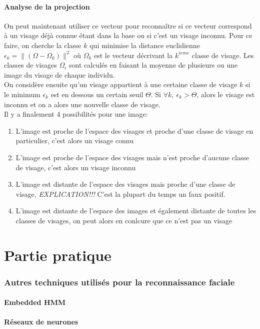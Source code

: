 \documentclass[12pt,french]{article}
\theoremstyle{plain}
\theoremstyle{definition}
\begin{document}
\subsection{Analyse de la projection}
On peut maintenant utiliser ce vecteur pour reconnaître si ce vecteur correspond à un visage déjà connue étant dans la base ou si c'est un visage inconnu.
Pour ce faire, on cherche la classe $k$ qui minimise la distance euclidienne $\epsilon_k = \|(\Omega - \Omega_k)\|^2$
où $\Omega_k$ est le vecteur décrivant la $k^{ieme}$ classe de visage. Les classes de visages $\Omega_i$ sont calculés en faisant la moyenne de plusieurs ou une image du visage de chaque individu. \\
On considère ensuite qu'un visage appartient à une certaine classe de visage $k$ si le minimum $\epsilon_k$ est en dessous un certain seuil $\Theta$.
Si $\forall k,~\epsilon_k > \Theta$, alors le visage est inconnu et on a alors une nouvelle classe de visage. \\
Il y a finalement 4 possibilités pour une image:
\begin{enumerate}
\item L'image est proche de l'espace des visages et proche d'une classe de visage en particulier, c'est alors un visage connu
\item L'image est proche de l'espace des visages mais n'est proche d'aucune classe de visage, c'est alors un visage inconnu
\item L'image est distante de l'espace des visages mais proche d'une classe de visage, \emph{EXPLICATION!!!} C'est la plupart du temps un faux positif.
\item L'image est distante de l'espace des images et également distante de toutes les classes de visages, on peut alors en conlcure que ce n'est pas un visage
\end{enumerate}




\newpage
\part{Partie pratique}
\section{Autres techniques utilisés pour la reconnaissance faciale}
\subsection{Embedded HMM}
\subsection{Réseaux de neurones}
\newpage
\end{document}
